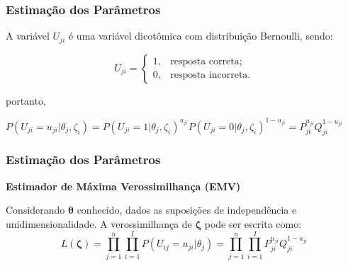 \documentclass{beamer}
\begin{document}
    
	\begin{frame}
		
		
		\frametitle{Estimação dos Parâmetros}
		
		A variável $U_{ji}$ é uma variável dicotômica com distribuição Bernoulli, sendo:
		
		\[U_{ji} =    \begin{cases}
			
			1, & \mbox{resposta correta;}  \\
			
			0, & \mbox{resposta incorreta.}
			
		\end{cases}
		\]
		
		portanto,  
		
		$ \label{eq:bern}
			P(U_{ji} = u_{ji}|\theta_j, \zeta_i) = P(U_{ji} = 1|\theta_j, \zeta_i)^{u_{ji}}
			P(U_{ji} = 0|\theta_j, \zeta_i)^{1 - u_{ji}} = P_{ji}^{u_{ji}}Q_{ji}^{1-u_{ji}}
		$
	
	\end{frame}
	
	
	\begin{frame}
		
		\frametitle{Estimação dos Parâmetros }
		
		\begin{center}
			\textbf{Estimador de Máxima Verossimilhança (EMV)}
		\end{center}
		
		Considerando  $ \boldsymbol{\theta} $ conhecido, dados as suposições de independência e unidimensionalidade. A verossimilhança de  $ \boldsymbol{\zeta} $ pode ser escrita como:
		\[
		L(\boldsymbol{\zeta}) =  \prod_{j=1}^{n}\prod_{i=1}^{I}P(U_{ij} = u_{ji}|\theta_j) = \prod_{j=1}^{n}\prod_{i=1}^{I}P_{ji}^{u_{ji}}Q_{ji}^{1-u_{ji}}
		\]
			
   \end{frame}
	
		
	
\end{document}
